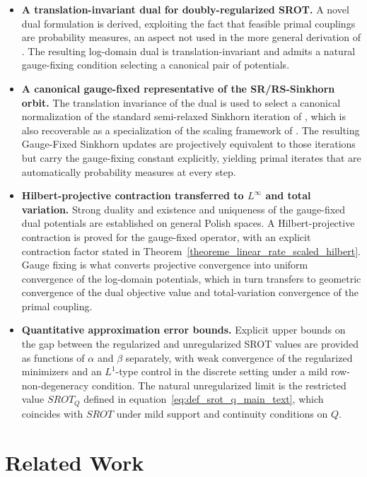 \documentclass{article}
\begin{document}
\begin{itemize}
    \item \textbf{A translation-invariant dual for doubly-regularized SROT.} A novel dual formulation is derived, exploiting the fact that feasible primal couplings are probability measures, an aspect not used in the more general derivation of \cite{chizat2018scaling}. The resulting log-domain dual is translation-invariant and admits a natural gauge-fixing condition selecting a canonical pair of potentials.

    \item \textbf{A canonical gauge-fixed representative of the SR/RS-Sinkhorn orbit.} The translation invariance of the dual is used to select a canonical normalization of the standard semi-relaxed Sinkhorn iteration of \cite{le2021robust, fukunaga2022convergence}, which is also recoverable as a specialization of the scaling framework of \cite{chizat2018scaling}. The resulting Gauge-Fixed Sinkhorn updates are projectively equivalent to those iterations but carry the gauge-fixing constant explicitly, yielding primal iterates that are automatically probability measures at every step.

    \item \textbf{Hilbert-projective contraction transferred to $L^\infty$ and total variation.} Strong duality and existence and uniqueness of the gauge-fixed dual potentials are established on general Polish spaces. A Hilbert-projective contraction is proved for the gauge-fixed operator, with an explicit contraction factor stated in Theorem~\ref{theoreme_linear_rate_scaled_hilbert}. Gauge fixing is what converts projective convergence into uniform convergence of the log-domain potentials, which in turn transfers to geometric convergence of the dual objective value and total-variation convergence of the primal coupling.

    \item \textbf{Quantitative approximation error bounds.} Explicit upper bounds on the gap between the regularized and unregularized SROT values are provided as functions of $\alpha$ and $\beta$ separately, with weak convergence of the regularized minimizers and an $L^1$-type control in the discrete setting under a mild row-non-degeneracy condition. The natural unregularized limit is the restricted value $SROT_Q$ defined in equation~\eqref{eq:def_srot_q_main_text}, which coincides with $SROT$ under mild support and continuity conditions on $Q$.
\end{itemize}
\section{Related Work}
\end{document}
